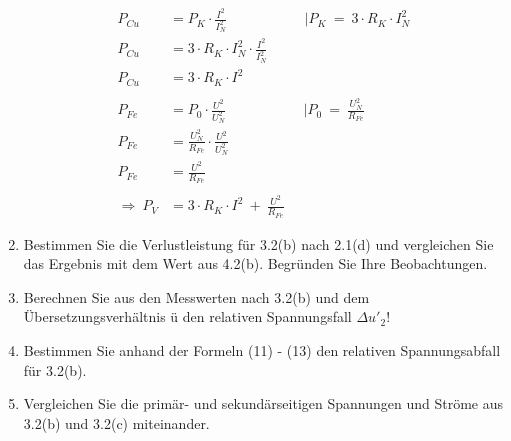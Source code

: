 \begin{enumerate}[label=\alph*)]
	      \begin{align*}
		      P_{Cu}               & = P_K\cdot \frac{I^2}{I^2_N}\mspace{100mu} |P_K\ =\ 3\cdot R_K\cdot I^2_N \\
		      P_{Cu}               & = 3\cdot R_K\cdot I^2_N\cdot \frac{I^2}{I^2_N}                            \\
		      P_{Cu}               & = 3\cdot R_K\cdot I^2                                                     \\
		      \\
		      P_{Fe}               & = P_0\cdot \frac{U^2}{U^2_N}\mspace{100mu} |P_0\ =\ \frac{U^2_N}{R_{Fe}}  \\
		      P_{Fe}               & = \frac{U^2_N}{R_{Fe}}\cdot \frac{U^2}{U^2_N}                             \\
		      P_{Fe}               & = \frac{U^2}{R_{Fe}}                                                      \\
		      \\
		      \Longrightarrow\ P_V & = 3\cdot R_K\cdot I^2\ +\ \frac{U^2}{R_{Fe}}
	      \end{align*}

	\item Bestimmen Sie die Verlustleistung für 3.2(b) nach 2.1(d) und vergleichen Sie
	      das Ergebnis mit dem Wert aus 4.2(b). Begründen Sie Ihre Beobachtungen.

	\item Berechnen Sie aus den Messwerten nach 3.2(b) und dem Übersetzungsverhältnis ü
	      den relativen Spannungsfall $\Delta u'_2$!

	\item Bestimmen Sie anhand der Formeln (11) - (13) den relativen Spannungsabfall für
	      3.2(b).

	\item Vergleichen Sie die primär- und sekundärseitigen Spannungen und Ströme aus
	      3.2(b) und 3.2(c) miteinander.
\end{enumerate}
